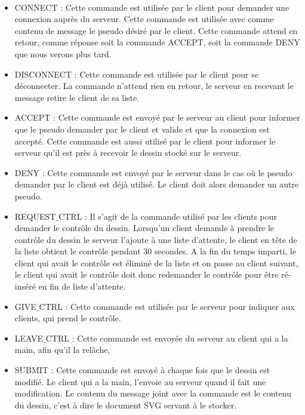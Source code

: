 \documentclass[a4paper,10pt]{article}
\begin{document}
\paragraph{}\begin{itemize}
\item CONNECT : Cette commande est utilisée par le client pour demander une connexion auprès du serveur. Cette commande est utilisée avec comme contenu de message le pseudo désiré par le client. Cette commande attend en retour, comme réponse soit la commande ACCEPT, soit la commande DENY que nous verons plus tard.

\item DISCONNECT : Cette commande est utilisée par le client pour se déconnecter. La commande n'attend rien en retour, le serveur en recevant le message retire le client de sa liste.

\item ACCEPT : Cette commande est envoyé par le serveur au client pour informer que le pseudo demander par le client et valide et que la connexion est accepté. Cette commande est aussi utilisé par le client pour informer le serveur qu'il est près à recevoir le dessin stocké sur le serveur.

\item DENY : Cette commande est envoyé par le serveur dans le cas où le pseudo demander par le client est déjà utilisé. Le client doit alors demander un autre pseudo.

\item  REQUEST$\_$CTRL : Il s'agit de la commande utilisé par les clients pour demander le contrôle du dessin.  Lorsqu'un client demande à prendre le contrôle du dessin le serveur l'ajoute à une liste d'attente, le client en tête de la liste obtient le contrôle pendant 30 secondes. A la fin du temps imparti, le client qui avait le contrôle est éliminé de la liste et on passe au client suivant, le client qui avait le contrôle doit donc redemander le contrôle pour être ré-inséré en fin de liste d'attente.

\item GIVE$\_$CTRL : Cette commande est utilisée par le serveur pour indiquer aux clients, qui prend le contrôle. 

\item LEAVE$\_$CTRL : Cette commande est envoyée du serveur au client qui a la main, afin qu'il la relâche,

\item SUBMIT : Cette commande est envoyé à chaque fois que le dessin est modifié. Le client qui a la main, l'envoie au serveur quand il fait une modification. Le contenu du message joint avec la commande est le contenu du dessin, c'est à dire le document SVG servant à le stocker.


\end{itemize}
\end{document}
